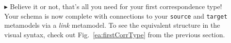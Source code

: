 \begin{itemize}
\item[$\blacktriangleright$] Believe it or not, that's all you need for your first correspondence type! Your schema is now complete with connections to your
\texttt{source} and \texttt{target} metamodels via a \emph{link} metamodel. To see the equivalent structure in the visual syntax, check out
Fig.~\ref{ea:firstCorrType} from the previous section.

\end{itemize}
